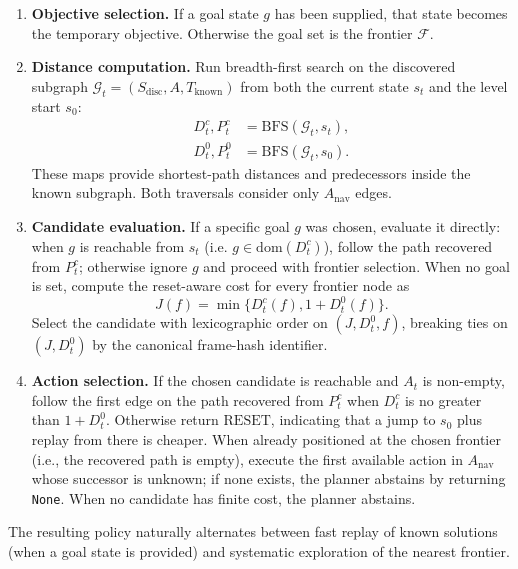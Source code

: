 \documentclass[11pt]{article}
\begin{document}
\begin{enumerate}
    \item \textbf{Objective selection.} If a goal state $g$ has been supplied, that state becomes the temporary objective. Otherwise the goal set is the frontier $\mathcal{F}$.
    \item \textbf{Distance computation.} Run breadth-first search on the discovered subgraph $\mathcal{G}_t = (S_{\mathrm{disc}}, A, T_{\mathrm{known}})$ from both the current state $s_t$ and the level start $s_0$:
    \begin{align}
    \label{eq:bfs-current}
    D_t^{c}, P_t^{c} &= \mathrm{BFS}(\mathcal{G}_t, s_t),\\
    \label{eq:bfs-reset}
    D_t^{0}, P_t^{0} &= \mathrm{BFS}(\mathcal{G}_t, s_0).
    \end{align}
    These maps provide shortest-path distances and predecessors inside the known subgraph. Both traversals consider only $A_{\mathrm{nav}}$ edges.
    \item \textbf{Candidate evaluation.} If a specific goal $g$ was chosen, evaluate it directly: when $g$ is reachable from $s_t$ (i.e. $g \in \mathrm{dom}(D_t^{c})$), follow the path recovered from $P_t^{c}$; otherwise ignore $g$ and proceed with frontier selection. When no goal is set, compute the reset-aware cost for every frontier node as
    \begin{equation}
        \label{eq:cost}
        J(f) = \min\{ D_t^{c}(f), 1 + D_t^{0}(f) \}.
    \end{equation}
    Select the candidate with lexicographic order on $(J, D_t^{0}, f)$, breaking ties on $(J, D_t^{0})$ by the canonical frame-hash identifier.
    \item \textbf{Action selection.} If the chosen candidate is reachable and $A_t$ is non-empty, follow the first edge on the path recovered from $P_t^{c}$ when $D_t^{c}$ is no greater than $1 + D_t^{0}$. Otherwise return $\mathrm{RESET}$, indicating that a jump to $s_0$ plus replay from there is cheaper. When already positioned at the chosen frontier (i.e., the recovered path is empty), execute the first available action in $A_{\mathrm{nav}}$ whose successor is unknown; if none exists, the planner abstains by returning \texttt{None}. When no candidate has finite cost, the planner abstains.
\end{enumerate}

The resulting policy naturally alternates between fast replay of known solutions (when a goal state is provided) and systematic exploration of the nearest frontier.
\end{document}
